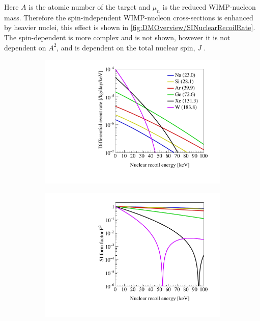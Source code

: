 Here $A$ is the atomic number of the target and $\mu_n$ is the reduced WIMP-nucleon mass. Therefore the spin-independent WIMP-nucleon cross-sections is enhanced by heavier nuclei, this effect is shown in \autoref{fig:DMOverview/SINuclearRecoilRate}. The spin-dependent is more complex and is not shown, however it is not dependent on $A^2$, and is dependent on the total nuclear spin, $J$ \cite{OlcinaSamblas:thesis}.
\begin{figure}[!ht]
     \centering
     \begin{subfigure}{0.49\textwidth}
         \centering
         \includegraphics[width=\textwidth]{figures/DMOverview/wimp_event_rate_si_m100.pdf}
         \caption{}
         \label{fig:DMOverview/SINuclearRecoilRate}
     \end{subfigure}
     \hfill
     \begin{subfigure}{0.49\textwidth}
         \centering
         \includegraphics[width=\textwidth]{figures/DMOverview/wimp_event_rate_si_m100_ff.pdf}

\end{subfigure}
\end{figure}
